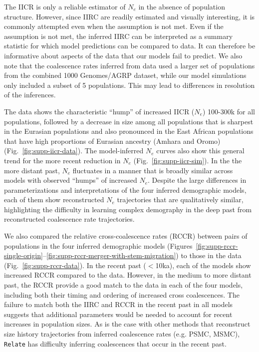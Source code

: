 \documentclass[]{article}
\newcommand{\Relate}{\texttt{Relate}\xspace}
\begin{document}
The IICR is only a reliable estimator of $N_e$ in the absence of population structure.
However, since IIRC are readily estimated and visually interesting,
it is commonly attempted even when the assumption is not met.
Even if the assumption is not met, the inferred IIRC can be interpreted as a
summary statistic for which model predictions can be compared to data.
It can therefore be
informative about aspects of the data that our models fail to predict.
We also note that the coalescence rates inferred from data used a larger set of
populations from the combined 1000 Genomes/AGRP dataset, while our model
simulations only included a subset of 5 populations. This may lead to
differences in resolution of the inferences.

The data shows the characteristic ``hump'' of increased IICR ($N_e$) 100-300k
for all populations, followed by a decrease in size among all populations that
is sharpest in the Eurasian populations and also pronounced in the East African
populations that have high proportions of Eurasian ancestry (Amhara and Oromo)
(Fig.~\ref{fig:supp-iicr-data}). The model-inferred $N_e$ curves also show this
general trend for the more recent reduction in $N_e$
(Fig.~\ref{fig:supp-iicr-sim}). In the the more distant past, $N_e$ fluctuates
in a manner that is broadly similar across models with observed ``humps'' of
increased $N_e$. Despite the large differences in parameterizations and
interpretations of the four inferred demographic models, each of them show
reconstructed $N_e$ trajectories that are qualitatively similar, highlighting
the difficulty in learning complex demography in the deep past from
reconstructed coalescence rate trajectories.

We also compared the relative cross-coalescence rates (RCCR) between pairs of
populations in the four inferred demographic models
(Figures~\ref{fig:supp-rccr-single-origin}--\ref{fig:supp-rccr-merger-with-stem-migration})
to those in the data (Fig.~\ref{fig:supp-rccr-data}). In the recent past
($<$10ka), each of the models show increased RCCR compared to the data.
However, in the medium to more distant past, the RCCR provide a good match to
the data in each of the four models, including both their timing and ordering
of increased cross coalescences. The failure to match both the IIRC and RCCR in
the recent past in all models suggests that additional parameters would be
needed to account for recent increases in population sizes. As is the case with
other methods that reconstruct size history trajectories from inferred coalescence
rates (e.g. PSMC, MSMC), \Relate has difficulty inferring coalescences that
occur in the recent past.
\end{document}
